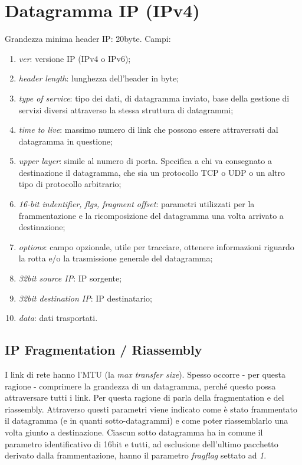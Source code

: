 \section{Datagramma IP (IPv4)}
Grandezza minima header IP: 20byte. Campi:
\begin{enumerate}
	\item \textit{ver}: versione IP (IPv4 o IPv6);
	\item \textit{header length}: lunghezza dell'header in byte;
	\item \textit{type of service}: tipo dei dati, di datagramma inviato, base della gestione di servizi diversi attraverso la stessa struttura di datagrammi;
	\item \textit{time to live}: massimo numero di link che possono essere attraversati dal datagramma in questione;
	\item \textit{upper layer}: simile al numero di porta. Specifica a chi va consegnato a destinazione il datagramma, che sia un protocollo TCP o UDP o un altro tipo di protocollo arbitrario;
	\item \textit{16-bit indentifier, flgs, fragment offset}: parametri utilizzati per la frammentazione e la ricomposizione del datagramma una volta arrivato a destinazione;
	\item \textit{options}: campo opzionale, utile per tracciare, ottenere informazioni riguardo la rotta e/o la trasmissione generale del datagramma;
	\item \textit{32bit source IP}: IP sorgente;
	\item \textit{32bit destination IP}: IP destinatario;
	\item \textit{data}: dati trasportati.
\end{enumerate}

\subsection{IP Fragmentation / Riassembly}
I link di rete hanno l'MTU (la \textit{max transfer size}). Spesso occorre - per questa ragione - comprimere la grandezza di un datagramma, perché questo possa attraversare tutti i link. Per questa ragione di parla della fragmentation e del riassembly. Attraverso questi parametri viene indicato come è stato frammentato il datagramma (e in quanti sotto-datagrammi) e come poter riassemblarlo una volta giunto a destinazione. Ciascun sotto datagramma ha in comune il parametro identificativo di 16bit e tutti, ad esclusione dell'ultimo pacchetto derivato dalla frammentazione, hanno il parametro \textit{fragflag} settato ad \textit{1}.

